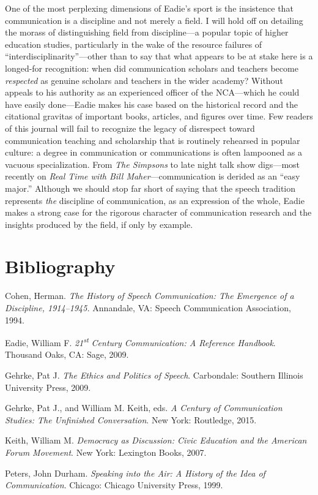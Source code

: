 \documentclass{tufte-handout}
\begin{document}
One of the most perplexing dimensions of Eadie's sport is the insistence
that communication is a discipline and not merely a field. I will hold
off on detailing the morass of distinguishing field from discipline---a
popular topic of higher education studies, particularly in the wake of
the resource failures of ``interdisciplinarity''---other than to say
that what appears to be at stake here is a longed-for recognition: when
did communication scholars and teachers become \emph{respected} as
genuine scholars and teachers in the wider academy? Without appeals to
his authority as an experienced officer of the NCA---which he could have
easily done---Eadie makes his case based on the historical record and
the citational gravitas of important books, articles, and figures over
time. Few readers of this journal will fail to recognize the legacy of
disrespect toward communication teaching and scholarship that is
routinely rehearsed in popular culture: a degree in communication or
communications is often lampooned as a vacuous specialization. From
\emph{The Simpsons} to late night talk show digs---most recently on
\emph{Real Time with Bill Maher}---communication is derided as an ``easy
major.'' Although we should stop far short of saying that the speech
tradition represents \emph{the} discipline of communication, as an
expression of the whole, Eadie makes a strong case for the rigorous
character of communication research and the insights produced by the
field, if only by example.




\section{Bibliography}\label{bibliography}

\begin{hangparas}{.25in}{1} 



Cohen, Herman. \emph{The History of Speech Communication: The Emergence
of a Discipline, 1914--1945.} Annandale, VA: Speech Communication
Association, 1994.

Eadie, William F. \emph{21}\textsuperscript{\emph{st}}\emph{ Century
Communication: A Reference Handbook}. Thousand Oaks, CA: Sage, 2009.

Gehrke, Pat J. \emph{The Ethics and Politics of Speech}. Carbondale:
Southern Illinois University Press, 2009.

Gehrke, Pat J., and William M. Keith, eds. \emph{A Century of
Communication Studies: The Unfinished Conversation}. New York:
Routledge, 2015.

Keith, William M. \emph{Democracy as Discussion: Civic Education and the
American Forum Movement}. New York: Lexington Books, 2007.

Peters, John Durham. \emph{Speaking into the Air: A History of the Idea
of Communication}. Chicago: Chicago University Press, 1999.



\end{hangparas}
\end{document}
